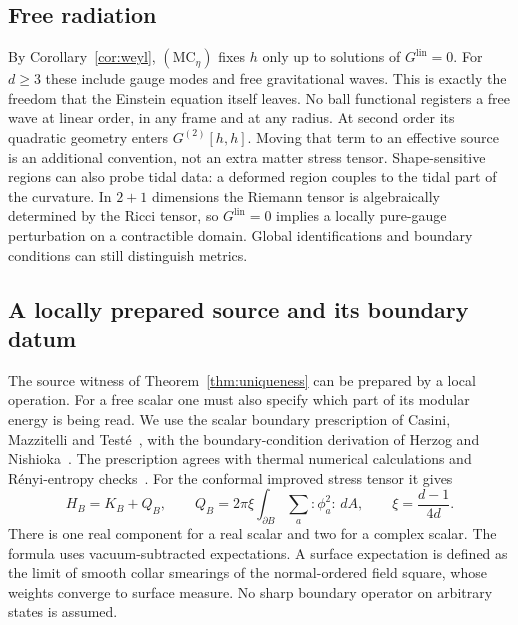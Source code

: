 \documentclass[12pt]{article}
\theoremstyle{definition}
\theoremstyle{remark}
\newcommand{\Glin}{G^{\mathrm{lin}}}
\begin{document}
\subsection{Free radiation}\label{subsec:radiation}

By Corollary~\ref{cor:weyl}, \((\mathrm{MC}_\eta)\) fixes \(h\) only up to solutions of
\(\Glin=0\). For \(d\ge3\) these include gauge modes and free gravitational waves. This is exactly the
freedom that the Einstein equation itself leaves. No ball functional registers a free wave
at linear order, in any frame and at any radius. At second order its quadratic geometry enters
$G^{(2)}[h,h]$. Moving that term to an effective source is an additional
convention, not an extra matter stress tensor. Shape-sensitive regions can also
probe tidal data: a deformed region couples to the tidal part of the curvature. In \(2+1\)
dimensions the Riemann tensor is algebraically determined by the Ricci tensor, so
\(\Glin=0\) implies a locally pure-gauge perturbation on a contractible domain.
Global identifications and boundary conditions can still distinguish metrics.

\subsection{A locally prepared source and its boundary datum}\label{subsec:prepared}

The source witness of Theorem~\ref{thm:uniqueness} can be prepared by a local operation.
For a free scalar one must also specify which part of its modular energy is being read.
We use the scalar boundary prescription of Casini, Mazzitelli and
Test\'e~\cite[Eq.~(58)]{CasiniMazzitelliTeste2015}, with the boundary-condition
derivation of Herzog and Nishioka~\cite[Secs.~1--2]{HerzogNishioka2016}.
The prescription agrees with thermal numerical calculations and R\'enyi-entropy
checks~\cite{Herzog2014,LLPS2015}. For the conformal improved stress tensor it gives
\begin{equation}\label{eq:scalaredge}
H_B=K_B+Q_B,\qquad
Q_B=2\pi\xi\int_{\partial B}\sum_a:\!\phi_a^2\!:\,dA,\qquad
\xi=\frac{d-1}{4d}.
\end{equation}
There is one real component for a real scalar and two for a complex scalar. The formula
uses vacuum-subtracted expectations. A surface expectation is defined as the limit of
smooth collar smearings of the normal-ordered field square, whose weights converge to
surface measure. No sharp boundary operator on arbitrary states is assumed.
\end{document}
